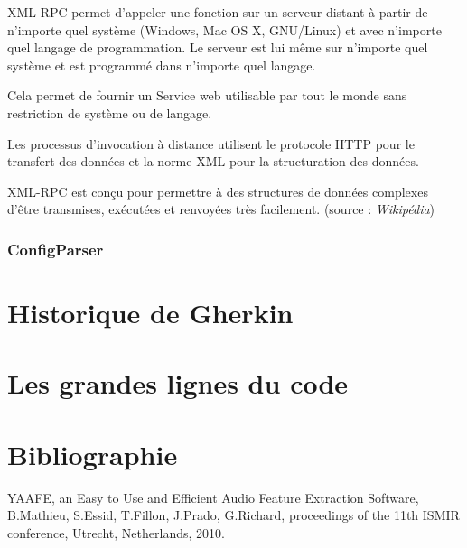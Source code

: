 \documentclass{report}
\begin{document}
XML-RPC permet d'appeler une fonction sur un serveur distant à partir de n'importe quel système (Windows, Mac OS X, GNU/Linux) et avec n'importe quel langage de programmation. Le serveur est lui même sur n'importe quel système et est programmé dans n'importe quel langage.

Cela permet de fournir un Service web utilisable par tout le monde sans restriction de système ou de langage.

Les processus d'invocation à distance utilisent le protocole HTTP pour le transfert des données et la norme XML pour la structuration des données.

XML-RPC est conçu pour permettre à des structures de données complexes d'être transmises, exécutées et renvoyées très facilement.
(source : \emph{Wikipédia})


\subsection{ConfigParser}




\chapter{Historique de Gherkin}


\chapter{Les grandes lignes du code}



\chapter*{Bibliographie}

YAAFE, an Easy to Use and Efficient Audio Feature Extraction Software, B.Mathieu, S.Essid, T.Fillon, J.Prado, G.Richard, proceedings of the 11th ISMIR conference, Utrecht, Netherlands, 2010.
\end{document}

